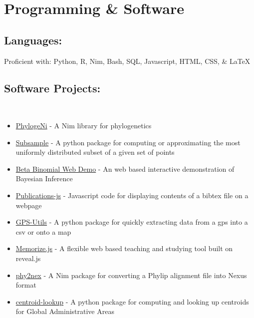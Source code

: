\section*{Programming \& Software}
\subsection*{Languages:}
Proficient with: 
Python,
R,
Nim,
Bash,
SQL,
Javascript,
HTML,
CSS,
\& LaTeX
\\

\subsection*{Software Projects:} \\

\begin{itemize}[leftmargin=3em, label={}, itemindent=-2em]

\item \href{http://github.com/kerrycobb/phylogeni}{PhylogeNi} 
- A Nim library for phylogenetics 

\item \href{http://github.com/kerrycobb/subsample}{Subsample} 
- A python package for computing or approximating the most uniformly distributed 
subset of a given set of points

\item \href{http://github.com/kerrycobb/beta-binomial-web-demo}{Beta Binomial Web Demo} 
- An web based interactive demonstration of Bayesian Inference

\item \href{http://github.com/kerrycobb/publications-js}{Publications-js} 
- Javascript code for displaying contents of a bibtex file on a webpage

\item \href{http://github.com/kerrycobb/gps-utils}{GPS-Utils} 
- A python package for quickly extracting data from a gps into a csv or onto a map

\item \href{http://www.github.com/kerrycobb/memorize.js}{Memorize.js} 
- A flexible web based teaching and studying tool built on reveal.js

\item \href{http://github.com/kerrycobb/phy2nex}{phy2nex}
- A Nim package for converting a Phylip alignment file into Nexus format

\item \href{http://github.com/kerrycobb/centroid-lookup}{centroid-lookup} 
- A python package for computing and looking up centroids for Global 
Administrative Areas

\end{itemize}



